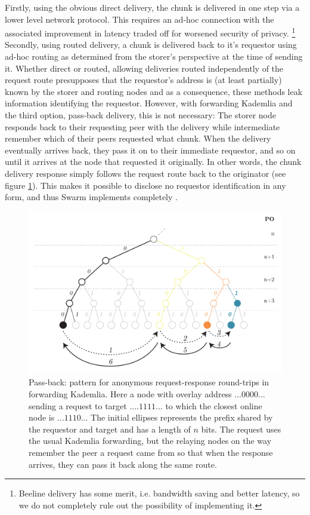 Firstly, using the obvious direct delivery, the chunk is delivered in one step via a lower level network protocol. This requires an ad-hoc connection with the associated improvement in latency traded off for worsened security of privacy.%
%
\footnote{Beeline delivery has some merit, i.e. bandwidth saving and better latency, so we do not completely rule out the possibility of implementing it. 
}
Secondly, using routed delivery, a chunk is delivered back to it's requestor using ad-hoc routing as determined from the storer's perspective at the time of sending it. Whether direct or routed, allowing deliveries routed independently of the request route presupposes that the requestor's address is (at least partially) known by the storer and routing nodes and as a consequence, these methods leak information identifying the requestor. However, with forwarding Kademlia and the third option, pass-back delivery, this is not necessary: The storer node responds back to their requesting peer with the delivery while intermediate  remember which of their peers requested what chunk. When the delivery eventually arrives back, they pass it on to their immediate requestor, and so on until it arrives at the node that requested it originally. In other words, the chunk delivery response simply follows the request route back to the originator (see figure \ref{fig:request-response}). This makes it possible to disclose no requestor identification in any form, and thus Swarm implements completely . 

\begin{figure}[htbp]
   \centering
   \includegraphics[width=\textwidth]{fig/request-response-forwarding.pdf}
   \caption[Pass-back: a pattern for anonymous request-response round-trips in forwarding Kademlia \statusgreen]{Pass-back: pattern for anonymous request-response round-trips in forwarding Kademlia. Here a node with overlay address $...0000...$ sending a request to target $....1111...$ to which the closest online node is $...1110...$ The initial ellipses represents the prefix shared by the requestor and target and has a length of $n$ bits. The request uses the usual Kademlia forwarding, but the relaying nodes on the way remember the peer a request came from so that when the response arrives, they can pass it back along the same route.}
   \label{fig:request-response}
\end{figure}

